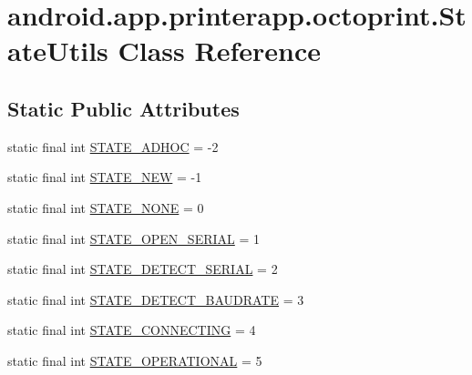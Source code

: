 \hypertarget{classandroid_1_1app_1_1printerapp_1_1octoprint_1_1_state_utils}{}\section{android.\+app.\+printerapp.\+octoprint.\+State\+Utils Class Reference}
\label{classandroid_1_1app_1_1printerapp_1_1octoprint_1_1_state_utils}
\subsection*{Static Public Attributes}
\begin{DoxyCompactItemize}
\item 
static final int \hyperlink{classandroid_1_1app_1_1printerapp_1_1octoprint_1_1_state_utils_a4969869dfd8ca0aa886e30bc0223eae0}{S\+T\+A\+T\+E\+\_\+\+A\+D\+H\+OC} = -\/2
\item 
static final int \hyperlink{classandroid_1_1app_1_1printerapp_1_1octoprint_1_1_state_utils_aa5e807d21db6724e6b25c727b9f17a68}{S\+T\+A\+T\+E\+\_\+\+N\+EW} = -\/1
\item 
static final int \hyperlink{classandroid_1_1app_1_1printerapp_1_1octoprint_1_1_state_utils_a84f98b23bd841ba06811d2f03f2eb690}{S\+T\+A\+T\+E\+\_\+\+N\+O\+NE} = 0
\item 
static final int \hyperlink{classandroid_1_1app_1_1printerapp_1_1octoprint_1_1_state_utils_ab9078178bfea75c54a53f040d9971fc6}{S\+T\+A\+T\+E\+\_\+\+O\+P\+E\+N\+\_\+\+S\+E\+R\+I\+AL} = 1
\item 
static final int \hyperlink{classandroid_1_1app_1_1printerapp_1_1octoprint_1_1_state_utils_ac6bc72b1bce5481c3e19205b0fbe38c1}{S\+T\+A\+T\+E\+\_\+\+D\+E\+T\+E\+C\+T\+\_\+\+S\+E\+R\+I\+AL} = 2
\item 
static final int \hyperlink{classandroid_1_1app_1_1printerapp_1_1octoprint_1_1_state_utils_a3f4398d7e0f21920b7868ec4a1ff198c}{S\+T\+A\+T\+E\+\_\+\+D\+E\+T\+E\+C\+T\+\_\+\+B\+A\+U\+D\+R\+A\+TE} = 3
\item 
static final int \hyperlink{classandroid_1_1app_1_1printerapp_1_1octoprint_1_1_state_utils_ae156f61926a4c147c77314439e21f21e}{S\+T\+A\+T\+E\+\_\+\+C\+O\+N\+N\+E\+C\+T\+I\+NG} = 4
\item 
static final int \hyperlink{classandroid_1_1app_1_1printerapp_1_1octoprint_1_1_state_utils_a82cefac9d138c4b79f9504fd097eb830}{S\+T\+A\+T\+E\+\_\+\+O\+P\+E\+R\+A\+T\+I\+O\+N\+AL} = 5
\item 

\end{DoxyCompactItemize}

